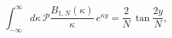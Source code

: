\begin{equation}
\int_{-\infty}^{\infty}d\kappa\,\mathscr{P}\frac{B_{1,N}(\kappa)}{\kappa}\,
e^{\kappa y}=\frac{2}{N}\,\tan \frac{2y}{N},
\label{BN2}
\end{equation}

